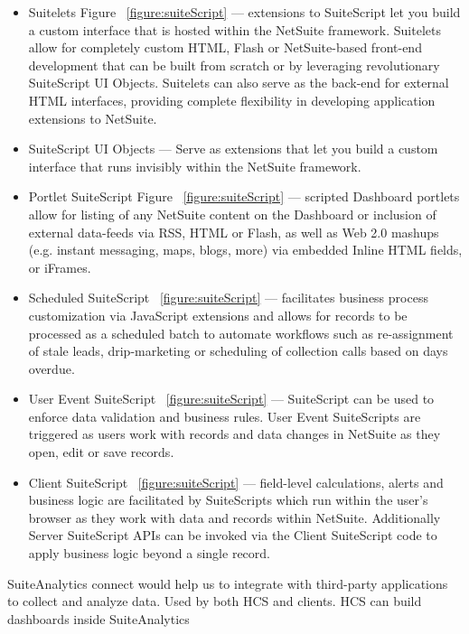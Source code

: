 \begin{itemize}
    \item Suitelets Figure ~\ref{figure:suiteScript} — extensions to SuiteScript let you build a custom interface that is hosted within the NetSuite framework. Suitelets allow for completely custom HTML, Flash or NetSuite-based front-end development that can be built from scratch or by leveraging revolutionary SuiteScript UI Objects. Suitelets can also serve as the back-end for external HTML interfaces, providing complete flexibility in developing application extensions to NetSuite.
    \item SuiteScript UI Objects — Serve as extensions that let you build a custom interface that runs invisibly within the NetSuite framework.
    \item Portlet SuiteScript Figure ~\ref{figure:suiteScript} — scripted Dashboard portlets allow for listing of any NetSuite content on the Dashboard or inclusion of external data-feeds via RSS, HTML or Flash, as well as Web 2.0 mashups (e.g. instant messaging, maps, blogs, more) via embedded Inline HTML fields, or iFrames.
    \item Scheduled SuiteScript ~\ref{figure:suiteScript} — facilitates business process customization via JavaScript extensions and allows for records to be processed as a scheduled batch to automate workflows such as re-assignment of stale leads, drip-marketing or scheduling of collection calls based on days overdue.
    \item User Event SuiteScript ~\ref{figure:suiteScript} — SuiteScript can be used to enforce data validation and business rules. User Event SuiteScripts are triggered as users work with records and data changes in NetSuite as they open, edit or save records.
    \item Client SuiteScript ~\ref{figure:suiteScript} — field-level calculations, alerts and business logic are facilitated by SuiteScripts which run within the user's browser as they work with data and records within NetSuite. Additionally Server SuiteScript APIs can be invoked via the Client SuiteScript code to apply business logic beyond a single record.
\end{itemize}


SuiteAnalytics connect would help us to integrate with third-party applications to collect and analyze data. Used by both HCS and clients. HCS can build dashboards inside SuiteAnalytics


